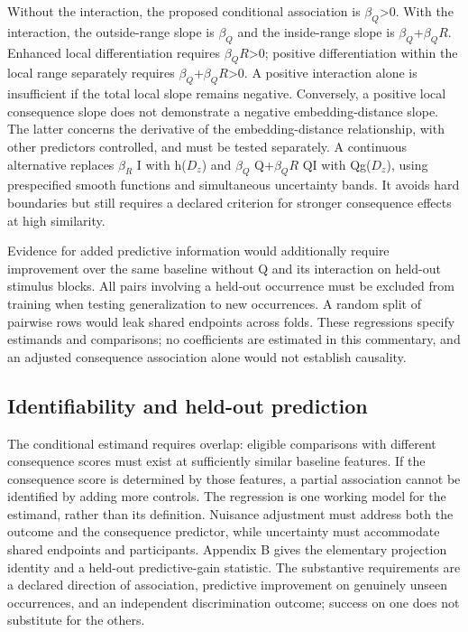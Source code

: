 \documentclass[11pt]{article}
\begin{document}
Without the interaction, the proposed conditional association is
\(\beta_Q\)\textgreater0. With the interaction, the outside-range slope
is \(\beta_Q\) and the inside-range slope is \(\beta_Q\)+\(\beta_QR\).
Enhanced local differentiation requires \(\beta_QR\)\textgreater0;
positive differentiation within the local range separately requires
\(\beta_Q\)+\(\beta_QR\)\textgreater0. A positive interaction alone is
insufficient if the total local slope remains negative. Conversely, a
positive local consequence slope does not demonstrate a negative
embedding-distance slope. The latter concerns the derivative of the
embedding-distance relationship, with other predictors controlled, and
must be tested separately. A continuous alternative replaces \(\beta_R\)
I with h(\(D_z\)) and \(\beta_Q\) Q+\(\beta_QR\) QI with Qg(\(D_z\)),
using prespecified smooth functions and simultaneous uncertainty bands.
It avoids hard boundaries but still requires a declared criterion for
stronger consequence effects at high similarity.

Evidence for added predictive information would additionally require
improvement over the same baseline without Q and its interaction on
held-out stimulus blocks. All pairs involving a held-out occurrence must
be excluded from training when testing generalization to new
occurrences. A random split of pairwise rows would leak shared endpoints
across folds. These regressions specify estimands and comparisons; no
coefficients are estimated in this commentary, and an adjusted
consequence association alone would not establish causality.

\hypertarget{identifiability-and-held-out-prediction}{%
\subsection{Identifiability and held-out
prediction}\label{identifiability-and-held-out-prediction}}

The conditional estimand requires overlap: eligible comparisons with
different consequence scores must exist at sufficiently similar baseline
features. If the consequence score is determined by those features, a
partial association cannot be identified by adding more controls. The
regression is one working model for the estimand, rather than its
definition. Nuisance adjustment must address both the outcome and the
consequence predictor, while uncertainty must accommodate shared
endpoints and participants. Appendix B gives the elementary projection
identity and a held-out predictive-gain statistic. The substantive
requirements are a declared direction of association, predictive
improvement on genuinely unseen occurrences, and an independent
discrimination outcome; success on one does not substitute for the
others.
\end{document}
